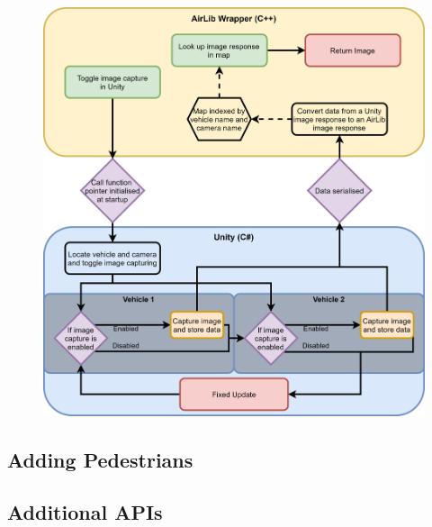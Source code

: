 \begin{figure}[h]
    \centering
    \includegraphics[width=1.0\textwidth]{06_Implementation/00_AirSim/Diagrams/imagecaptureUpdated.png}
    \caption{} \label{06:imageCaptureUpdated}
\end{figure}

\subsection{Adding Pedestrians}


\subsection{Additional APIs}

